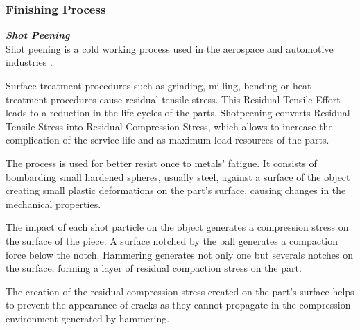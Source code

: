\subsubsection{Finishing Process}
 
 \textbf{\emph{ Shot Peening}}\\

 
 Shot peening is a cold working process used in the aerospace and automotive industries \cite{meo2003finite}.\par
Surface treatment procedures such as grinding, milling, bending or heat treatment procedures cause residual tensile stress. This Residual Tensile Effort leads to a reduction in the life cycles of the parts. Shotpeening converts Residual Tensile Stress into Residual Compression Stress, which allows to increase the complication of the service life and as maximum load resources of the parts.\cite{majzoobi2005three}\par

The process is used for better resist once to metals' fatigue. It consists of bombarding small hardened spheres, usually steel, against a surface of the object creating small plastic deformations on the part's surface, causing changes in the mechanical properties. \cite{majzoobi2005three,meo2003finite}\par
The impact of each shot particle on the object generates a compression stress on the surface of the piece. A surface notched by the ball generates a compaction force below the notch. Hammering generates not only one but severals notches on the surface, forming a layer of residual compaction stress on the part. \cite{meo2003finite,SP}\par
The creation of the residual compression stress created on the part's surface helps to prevent the appearance of cracks as they cannot propagate in the compression environment generated by hammering. \cite{meo2003finite,SP}\par

